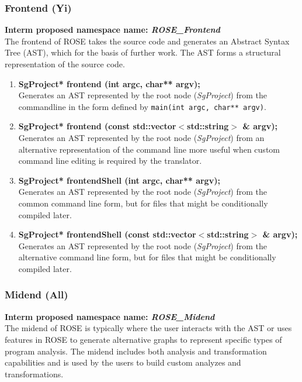 \subsubsection{Frontend (Yi)}
{\bf Interm proposed namespace name: {\em ROSE\_Frontend}} \\
    The frontend of ROSE takes the source code
and generates an Abstract Syntax Tree (AST), which for the basis of
further work. The AST forms a structural representation of the source
code.
\begin{enumerate}
   \item {\bf SgProject* frontend (int argc, char** argv);} \\
   Generates an AST represented by the root node ({\em SgProject}) from
   the commandline in the form defined by {\tt main(int argc, char** argv)}.

   \item {\bf SgProject* frontend (const std::vector$<$std::string$>$ \& argv);} \\
   Generates an AST represented by the root node ({\em SgProject}) from
   an alternative representation of the command line more useful when 
   custom command line editing is required by the translator.

   \item {\bf SgProject* frontendShell (int argc, char** argv);} \\
   Generates an AST represented by the root node ({\em SgProject}) from
   the common command line form, but for files that might be conditionally 
   compiled later.

   \item {\bf SgProject* frontendShell (const std::vector$<$std::string$>$ \& argv);} \\
   Generates an AST represented by the root node ({\em SgProject}) from
   the alternative command line form, but for files that might be conditionally 
   compiled later.
\end{enumerate}

\subsubsection{Midend (All)}
{\bf Interm proposed namespace name: {\em ROSE\_Midend}} \\
   The midend of ROSE is typically where the user interacts with the AST
or uses features in ROSE to generate alternative graphs to represent
specific types of program analysis. The midend includes both analysis
and transformation capabilities and is used by the users to build 
custom analyzes and transformations.

